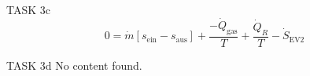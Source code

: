TASK 3c  
\[
0 = \dot{m} \left[ s_{\text{ein}} - s_{\text{aus}} \right] + \frac{-\dot{Q}_{\text{gas}}}{T} + \frac{\dot{Q}_{R}}{T} - \dot{S}_{\text{EV2}}
\]

TASK 3d  
No content found.